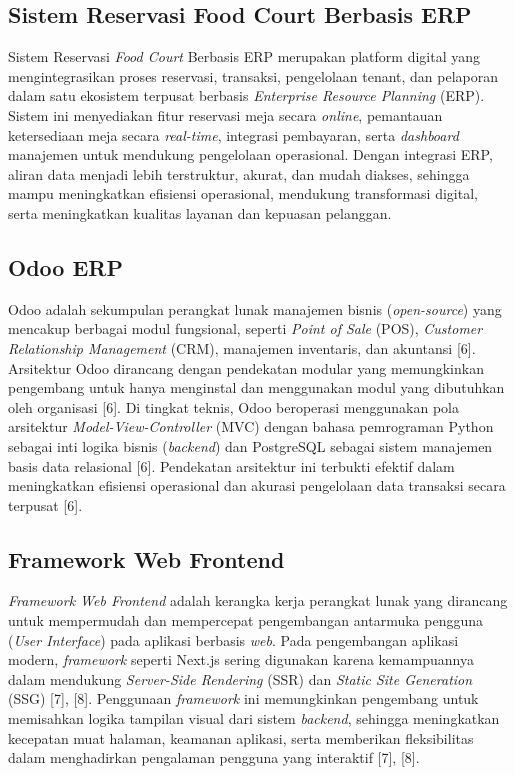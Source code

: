 \documentclass[conference]{IEEEtran}
\begin{document}
\subsection{Sistem Reservasi Food Court Berbasis ERP}
Sistem Reservasi \textit{Food Court} Berbasis ERP merupakan platform digital yang mengintegrasikan proses reservasi, transaksi, pengelolaan tenant, dan pelaporan dalam satu ekosistem terpusat berbasis \textit{Enterprise Resource Planning} (ERP). Sistem ini menyediakan fitur reservasi meja secara \textit{online}, pemantauan ketersediaan meja secara \textit{real-time}, integrasi pembayaran, serta \textit{dashboard} manajemen untuk mendukung pengelolaan operasional. Dengan integrasi ERP, aliran data menjadi lebih terstruktur, akurat, dan mudah diakses, sehingga mampu meningkatkan efisiensi operasional, mendukung transformasi digital, serta meningkatkan kualitas layanan dan kepuasan pelanggan.

\subsection{Odoo ERP}
Odoo adalah sekumpulan perangkat lunak manajemen bisnis (\textit{open-source}) yang mencakup berbagai modul fungsional, seperti \textit{Point of Sale} (POS), \textit{Customer Relationship Management} (CRM), manajemen inventaris, dan akuntansi [6]. Arsitektur Odoo dirancang dengan pendekatan modular yang memungkinkan pengembang untuk hanya menginstal dan menggunakan modul yang dibutuhkan oleh organisasi [6]. Di tingkat teknis, Odoo beroperasi menggunakan pola arsitektur \textit{Model-View-Controller} (MVC) dengan bahasa pemrograman Python sebagai inti logika bisnis (\textit{backend}) dan PostgreSQL sebagai sistem manajemen basis data relasional [6]. Pendekatan arsitektur ini terbukti efektif dalam meningkatkan efisiensi operasional dan akurasi pengelolaan data transaksi secara terpusat [6].

\subsection{Framework Web Frontend}
\textit{Framework Web Frontend} adalah kerangka kerja perangkat lunak yang dirancang untuk mempermudah dan mempercepat pengembangan antarmuka pengguna (\textit{User Interface}) pada aplikasi berbasis \textit{web}. Pada pengembangan aplikasi modern, \textit{framework} seperti Next.js sering digunakan karena kemampuannya dalam mendukung \textit{Server-Side Rendering} (SSR) dan \textit{Static Site Generation} (SSG) [7], [8]. Penggunaan \textit{framework} ini memungkinkan pengembang untuk memisahkan logika tampilan visual dari sistem \textit{backend}, sehingga meningkatkan kecepatan muat halaman, keamanan aplikasi, serta memberikan fleksibilitas dalam menghadirkan pengalaman pengguna yang interaktif [7], [8].
\end{document}
